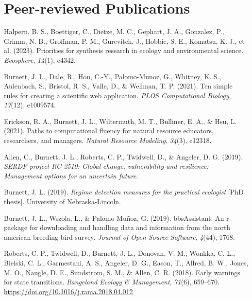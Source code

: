 \documentclass[11pt,a4paper,]{awesome-cv}
\begin{document}
\hypertarget{peer-reviewed-publications}{%
\section{Peer-reviewed Publications}\label{peer-reviewed-publications}}

\hypertarget{bibliography}{}
\leavevmode{}%
Halpern, B. S., Boettiger, C., Dietze, M. C., Gephart, J. A., Gonzalez,
P., Grimm, N. B., Groffman, P. M., Gurevitch, J., Hobbie, S. E.,
Komatsu, K. J., et al. (2023). Priorities for synthesis research in
ecology and environmental science. \emph{Ecosphere}, \emph{14}(1),
e4342.

\leavevmode{}%
Burnett, J. L., Dale, R., Hou, C.-Y., Palomo-Munoz, G., Whitney, K. S.,
Aulenbach, S., Bristol, R. S., Valle, D., \& Wellman, T. P. (2021). Ten
simple rules for creating a scientific web application. \emph{PLOS
Computational Biology}, \emph{17}(12), e1009574.

\leavevmode{}%
Erickson, R. A., Burnett, J. L., Wiltermuth, M. T., Bulliner, E. A., \&
Hsu, L. (2021). Paths to computational fluency for natural resource
educators, researchers, and managers. \emph{Natural Resource Modeling},
\emph{34}(3), e12318.

\leavevmode{}%
Allen, C., Burnett, J. L., Roberts, C. P., Twidwell, D., \& Angeler, D.
G. (2019). \emph{SERDP project RC-2510: Global change, vulnerability and
resilience: Management options for an uncertain future}.

\leavevmode{}%
Burnett, J. L. (2019). \emph{Regime detection measures for the practical
ecologist} {[}PhD thesis{]}. University of Nebraska-Lincoln.

\leavevmode{}%
Burnett, J. L., Wszola, L., \& Palomo-Muñoz, G. (2019). bbsAssistant: An
r package for downloading and handling data and information from the
north american breeding bird survey. \emph{Journal of Open Source
Software}, \emph{4}(44), 1768.

\leavevmode{}%
Roberts, C. P., Twidwell, D., Burnett, J. L., Donovan, V. M., Wonkka, C.
L., Bielski, C. L., Garmestani, A. S., Angeler, D. G., Eason, T.,
Allred, B. W., Jones, M. O., Naugle, D. E., Sundstrom, S. M., \& Allen,
C. R. (2018). Early warnings for state transitions. \emph{Rangeland
Ecology \& Management}, \emph{71}(6), 659--670.
\url{https://doi.org/10.1016/j.rama.2018.04.012}
\end{document}
